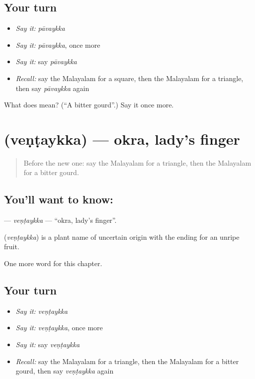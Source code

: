\subsection*{Your turn}
\begin{itemize}
\raggedright
  \item \emph{Say it:} \emph{pāvaykka}
  \item \emph{Say it:} \emph{pāvaykka}, once more
  \item \emph{Say it:} say \emph{pāvaykka}
  \item \emph{Recall:} say the Malayalam for a square, then the Malayalam for a triangle, then say \emph{pāvaykka} again
\end{itemize}

\begin{tcolorbox}[breakable,colback=teal!4,colframe=teal!35!black,title={Before you move on}]
What does  mean? (\textquotedblleft{}A bitter gourd\textquotedblright{}.) Say it once more.
\end{tcolorbox}
\section[\texorpdfstring{\ml{വെണ്ടയ്ക്ക} (veṇṭaykka)}{വെണ്ടയ്ക്ക (veṇṭaykka)}]{ (veṇṭaykka) — okra, lady's finger}

\label{lesson:ML-C259-ventaykka}



\begin{quote}
Before the new one: say the Malayalam for a triangle, then the Malayalam for a bitter gourd.
\end{quote}

\subsection*{You'll want to know: }
\textbf{} — \emph{veṇṭaykka} — \textquotedblleft{}okra, lady's finger\textquotedblright{}.

\begin{cousinweb}
\textbf{} (\emph{veṇṭaykka}) is a plant name of uncertain origin with the ending for an unripe fruit.
\end{cousinweb}

\begin{grammarlens}[title={What you've built}]
One more word for this chapter.
\end{grammarlens}

\subsection*{Your turn}
\begin{itemize}
\raggedright
  \item \emph{Say it:} \emph{veṇṭaykka}
  \item \emph{Say it:} \emph{veṇṭaykka}, once more
  \item \emph{Say it:} say \emph{veṇṭaykka}
  \item \emph{Recall:} say the Malayalam for a triangle, then the Malayalam for a bitter gourd, then say \emph{veṇṭaykka} again
\end{itemize}

